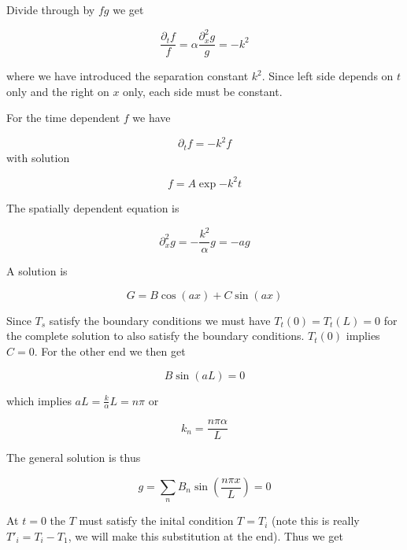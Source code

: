 \documentclass{article}
\begin{document}
Divide through by $fg$ we get

\begin{equation}
\frac{\partial_t f}{f} = \alpha \frac{\partial_x^2 g}{g} = -k^2
\end{equation}

where we have introduced the  separation constant $k^2$. Since left side depends on $t$ only and the right on $x$ only, each side must be constant.

For the time dependent $f$ we have

\begin{equation}
\partial_t f= -k^2 f
\end{equation}
with solution

\begin{equation}
f = A \exp{-k^2 t}
\end{equation}

The spatially dependent equation is

\begin{equation}
\partial_x^2 g = -\frac{k^2}{\alpha}g = -a g
\end{equation}

A solution is

\begin{equation}
G = B\cos(ax) + C \sin(ax)
\end{equation}

Since $T_s$ satisfy the boundary conditions we must have $T_t(0) = T_t(L) =0$ for the complete solution to also satisfy the boundary conditions. $T_t(0)$ implies $C = 0$. For the other end we then get

\begin{equation}
B \sin(aL) = 0
\end{equation}

which implies $aL = \frac{k}{\alpha} L =  n\pi$ or

\begin{equation}
k_n = \frac{n\pi\alpha}{L}
\end{equation} 

The general solution is thus

\begin{equation}
g = \sum_n B_n \sin(\frac{n\pi x}{L}) = 0
\end{equation}


At $t=0$ the $T$ must satisfy the inital condition $T = T_i$ (note this is really $T'_i = T_i - T_1$, we will make this substitution at the end). Thus we get
\end{document}
